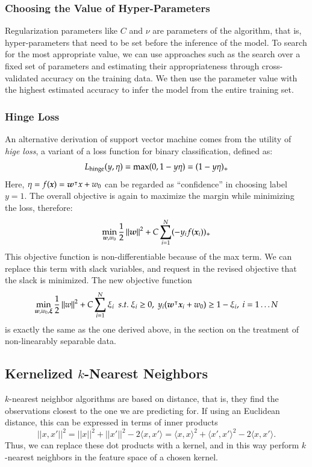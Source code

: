 \begin{refsection}
\subsubsection*{Choosing the Value of Hyper-Parameters}

Regularization parameters like $C$ and $\nu$ are parameters of the algorithm, that is, hyper-parameters that need to be set before the inference of the model. To search for the most appropriate value, we can use approaches such as the search over a fixed set of parameters and estimating their appropriateness through cross-validated accuracy on the training data. We then use the parameter value with the highest estimated accuracy to infer the model from the entire training set.

\subsubsection*{Hinge Loss}

An alternative derivation of support vector machine comes from the utility of {\em hige loss}, a variant of a loss function for binary classification, defined as:
$$ L_{\rm hinge}(y, \eta) = \max(0, 1-y\eta) = (1-y\eta)_{+} $$
Here, $\eta=f(\boldsymbol{x})=\boldsymbol{w}^\intercal x + w_0$ can be regarded as ``confidence'' in choosing label $y=1$. The overall objective is again to maximize the margin while minimizing the loss, therefore:
$$ \min_{\boldsymbol{w},w_0}{1\over 2}\left\lVert\boldsymbol{w}\right\rVert^2 + C\sum_{i=1}^N(-y_i f(\boldsymbol{x}_i))_{+} $$
This objective function is non-differentiable because of the max term. We can replace this term with slack variables, and request in the revised objective that the slack is minimized. The new objective function 
$$ \min_{\boldsymbol{w},w_0,\boldsymbol{\xi}} {1\over 2}\left\lVert w\right\rVert^2+C\sum_{i=1}^N\xi_i\ \ s.t.\ \xi_i\geq 0,\ y_i(\boldsymbol{w}^\intercal \boldsymbol{x}_i+w_0)\geq 1-\xi_i,\ i=1\ldots N$$
is exactly the same as the one derived above, in the section on the treatment of non-linearably separable data.


\subsection*{Kernelized $k$-Nearest Neighbors}

$k$-nearest neighbor algorithms are based on distance, that is, they find the observations closest to the one we are predicting for. If using an Euclidean distance, this can be expressed in terms of inner products 
%
$$\lvert\lvert x, x' \rvert\rvert^2 =  \lvert\lvert x \rvert\rvert^2 + \lvert\lvert x' \rvert\rvert^2 - 2 \langle x, x'\rangle  =  \langle x, x\rangle^2 + \langle x', x'\rangle^2 - 2 \langle x, x'\rangle.$$
%
Thus, we can replace these dot products with a kernel, and in this way perform $k$-nearest neighbors in the feature space of a chosen kernel.


\end{refsection}
